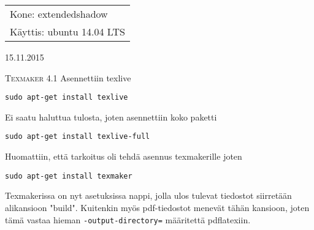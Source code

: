 \documentclass[main.tex]{subfiles}
\begin{document}
\thispagestyle{empty}
\begin{tabular}[t]{l}
Kone: extendedshadow\\
Käyttis: ubuntu 14.04 LTS
\end{tabular}
\hfill 15.11.2015

{\scshape\Large{Texmaker 4.1}}
Asennettiin texlive

\begin{lstlisting}
sudo apt-get install texlive
\end{lstlisting}

Ei saatu haluttua tulosta, joten asennettiin koko paketti

\begin{lstlisting}
sudo apt-get install texlive-full
\end{lstlisting}

Huomattiin, että tarkoitus oli tehdä asennus texmakerille joten

\begin{lstlisting}
sudo apt-get install texmaker
\end{lstlisting}

Texmakerissa on nyt asetuksissa nappi, jolla ulos tulevat tiedostot siirretään alikansioon "build". Kuitenkin myös pdf-tiedostot menevät tähän kansioon, joten tämä vastaa hieman \texttt{-output-directory=} määritettä pdflatexiin.
\end{document}
